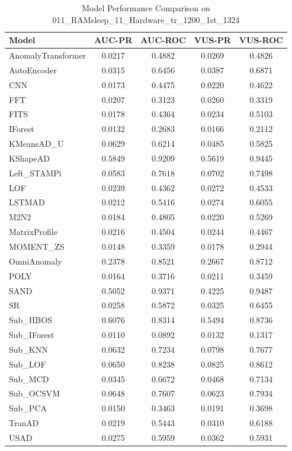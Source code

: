 \documentclass[12pt,oneside]{article}
\begin{document}
\begin{table}[H]
    \centering
    \caption{Model Performance Comparison on 011\_RAMsleep\_11\_Hardware\_tr\_1200\_1st\_1324}
    \begin{tabular}{|l|c|c|c|c|}
        \toprule
        \textbf{Model} & \textbf{AUC-PR} & \textbf{AUC-ROC} & \textbf{VUS-PR} & \textbf{VUS-ROC} \\
        \midrule
        AnomalyTransformer & 0.0217 & 0.4882 & 0.0269 & 0.4826 \\
        AutoEncoder & 0.0315 & 0.6456 & 0.0387 & 0.6871 \\
        CNN & 0.0173 & 0.4475 & 0.0220 & 0.4622 \\
        FFT & 0.0207 & 0.3123 & 0.0260 & 0.3319 \\
        FITS & 0.0178 & 0.4364 & 0.0234 & 0.5103 \\
        IForest & 0.0132 & 0.2683 & 0.0166 & 0.2112 \\
        KMeansAD\_U & 0.0629 & 0.6214 & 0.0485 & 0.5825 \\
        KShapeAD & 0.5849 & 0.9209 & 0.5619 & 0.9445 \\
        Left\_STAMPi & 0.0583 & 0.7618 & 0.0702 & 0.7498 \\
        LOF & 0.0239 & 0.4362 & 0.0272 & 0.4533 \\
        LSTMAD & 0.0212 & 0.5416 & 0.0274 & 0.6055 \\
        M2N2 & 0.0184 & 0.4805 & 0.0220 & 0.5269 \\
        MatrixProfile & 0.0216 & 0.4504 & 0.0244 & 0.4467 \\
        MOMENT\_ZS & 0.0148 & 0.3359 & 0.0178 & 0.2944 \\
        OmniAnomaly & 0.2378 & 0.8521 & 0.2667 & 0.8712 \\
        POLY & 0.0164 & 0.3716 & 0.0211 & 0.3459 \\
        SAND & 0.5052 & 0.9371 & 0.4225 & 0.9487 \\
        SR & 0.0258 & 0.5872 & 0.0325 & 0.6455 \\
        Sub\_HBOS & 0.6076 & 0.8314 & 0.5494 & 0.8736 \\
        Sub\_IForest & 0.0110 & 0.0892 & 0.0132 & 0.1317 \\
        Sub\_KNN & 0.0632 & 0.7234 & 0.0798 & 0.7677 \\
        Sub\_LOF & 0.0650 & 0.8238 & 0.0825 & 0.8612 \\
        Sub\_MCD & 0.0345 & 0.6672 & 0.0468 & 0.7134 \\
        Sub\_OCSVM & 0.0648 & 0.7607 & 0.0623 & 0.7934 \\
        Sub\_PCA & 0.0150 & 0.3463 & 0.0191 & 0.3698 \\
        TranAD & 0.0219 & 0.5443 & 0.0310 & 0.6188 \\
        USAD & 0.0275 & 0.5959 & 0.0362 & 0.5931 \\
        \bottomrule
    \end{tabular}
    
    \label{tab:model_performance_RAMsleep}
\end{table}
\end{document}
